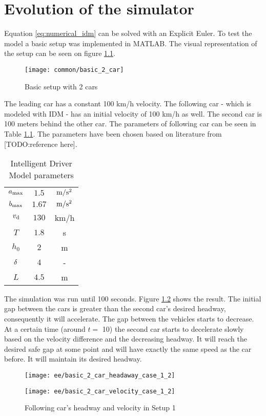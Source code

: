 \chapter{Evolution of the simulator}
	Equation \ref{eq:numerical_idm} can be solved with an Explicit Euler. To test the model a basic setup was implemented in MATLAB. The visual representation of the setup can be seen on figure \ref{fig:basic2car}.
	\begin{figure}[ht]
		\centering
		\texttt{[image: common/basic\_2\_car]}
		\caption{Basic setup with 2 cars}
		\label{fig:basic2car}
	\end{figure}
	The leading car has a constant 100 km/h velocity. The following car - which is modeled with IDM - has an initial velocity of 100 km/h as well. The second car is 100 meters behind the other car. The parameters of following car can be seen in Table \ref{tab:idm_params}. The parameters have been chosen based on literature from [TODO:reference here].
	\begin{table}[ht]
		\begin{center}
			\begin{tabular}{ |c|c|c| }
				\hline
				$a_{\rm max}$ & $1.5$ & $\rm m/s^2$ \\
				$b_{\rm max}$ & $1.67$ & $\rm m/s^2$ \\
				$v_{\rm d}$ & $130$ & km/h \\
				$T$ & $1.8$ & s \\
				$h_0$ & $2$ & m \\
				$\rm \delta$ & $4$ & - \\
				$L$ & $4.5$ & m \\
				\hline
			\end{tabular}
		\end{center}
		\caption{Intelligent Driver Model parameters}
		\label{tab:idm_params}
	\end{table}
	The simulation was run until 100 seconds. Figure \ref{fig:basic2car_case_1} shows the result. The initial gap between the cars is greater than the second car's desired headway, consequently it will accelerate. The gap between the vehicles starts to decrease. At a certain time (around $t =$ 10) the second car starts to decelerate slowly based on the velocity difference and the decreasing headway. It will reach the desired safe gap at some point and will have exactly the same speed as the car before. It will maintain its desired headway.
	\begin{figure}
		\centering
		\begin{minipage}{.5\textwidth}
			\centering
			\texttt{[image: ee/basic\_2\_car\_headaway\_case\_1\_2]}
		\end{minipage}\hfill
		\begin{minipage}{.5\textwidth}
			\centering
			\texttt{[image: ee/basic\_2\_car\_velocity\_case\_1\_2]}
		\end{minipage}
		\caption{Following car's headway and velocity in Setup 1}
		\label{fig:basic2car_case_1}
	\end{figure}

